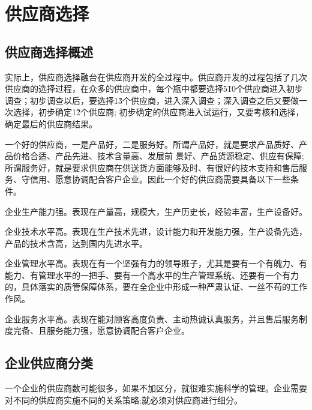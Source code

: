 \section {供应商选择}

\subsection {供应商选择概述}

    实际上，供应商选择融台在供应商开发的全过程中。供应商开发的过程包括了几次供应商的选择过程，在众多的供应商中，每个瓶中都要选择5\~10个供应商进入初步调查；初步调查以后，要选择1\~3个供应商，进入深入调查；深入调查之后又要做一次选择，初步确定1\~2个供应商; 初步确定的供应商进入试运行，又要考核和选择，确定最后的供应商结果。

    一个好的供应商，一是产品好，二是服务好。所谓产品好，就是要求产品质好、产品价格合适、产品先进、技术含量高、发展前 景好、产品货源稳定、供应有保障; 所谓服务好，就是要求供应商在供送货方面能够及时、有很好的技木支持和售后服务、守信用、愿意协调配合客户企业。因此一个好的供应商需要具备以下一些条件。

    \begin{enumerate.zh}
    \item 企业生产能力强。表现在产量高，规模大，生产历史长，经验丰富，生产设备好。

    \item 企业技术水平高。表现在生产技术先进，设计能力和开发能力强，生产设备先选，产品的技术含高，达到国内先进水平。

    \item 企业管理水平高。表现在有一个坚强有力的领导班子，尤其是要有一个有魄力、有能力、有管理水平的一把手、要有一个高水平的生产管理系统、还要有一个有力的，具体落实的质管保障体系，要在全企业中形成一种严肃认证、一丝不苟的工作作风。

    \item 企业服务水平高。表现在能对顾客高度负责、主动热诚认真服务，并且售后服务制度完备、且服务能力强，愿意协调配合客户企业。

    \end{enumerate.zh}

\subsection {企业供应商分类}

    一个企业的供应商数可能很多，如果不加区分，就很难实施科学的管理。企业需要对不同的供应商实施不同的关系策略;就必须对供应商进行细分。

